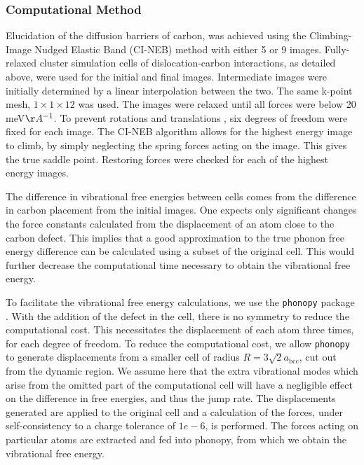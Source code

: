 \documentclass[a4paper,11pt]{article}
\begin{document}
\subsubsection{Computational Method}
\label{sec:orgb18fd6a}

Elucidation of the diffusion barriers of carbon, was achieved using the Climbing-Image Nudged
Elastic Band (CI-NEB) method with either 5 or 9 images. Fully-relaxed cluster simulation cells of
dislocation-carbon interactions, as detailed above, were used for the initial and final
images. Intermediate images were initially determined by a linear interpolation between the
two. The same k-point mesh, \(1\times 1 \times 12\) was used. The images were relaxed until all
forces were below 20 meV\(\AA^{-1}\). To prevent rotations and translations \cite{berne1998classical},
six degrees of freedom were fixed for each image. The CI-NEB algorithm allows for the highest
energy image to climb, by simply neglecting the spring forces acting on the image. This gives the
true saddle point. Restoring forces were checked for each of the highest energy images.



The difference in vibrational free energies between cells comes from the difference in carbon
placement from the initial images. One expects only significant changes the force constants calculated from the
displacement of an atom close to the carbon defect. This implies that a good
approximation to the true phonon free energy difference can be calculated using a subset of the
original cell. This would further decrease the computational time necessary to obtain the
vibrational free energy.

To facilitate the vibrational free energy calculations, we use the \texttt{phonopy} package
\cite{phonopy}. With the addition of the defect in the cell, there is no symmetry to reduce the
computational cost. This necessitates the displacement of each atom three
times, for each degree of freedom. To reduce
the computational cost, we allow \texttt{phonopy} to generate displacements from a smaller cell of
radius \(R = 3\sqrt{2}a_{\text{bcc}}\), cut out from the dynamic region. We assume here that the
extra vibrational modes which arise from the omitted part of the computational cell will have a
negligible effect on the difference in free energies, and thus the jump rate. The displacements
generated are applied to the original cell and a calculation of the forces, under
self-consistency to a charge tolerance of \(1e-6\), is performed. The forces acting on particular
atoms are extracted and fed into phonopy, from which we obtain the vibrational free energy.
\end{document}
